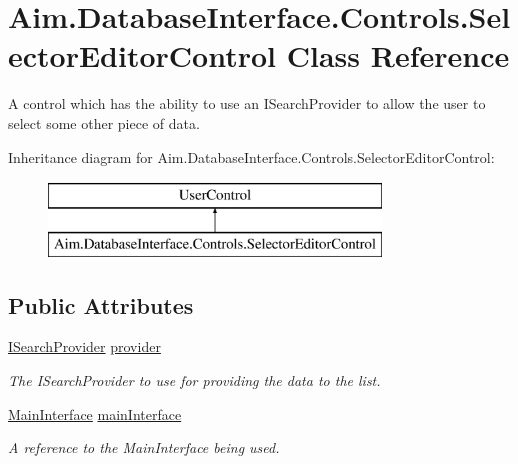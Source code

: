 \hypertarget{class_aim_1_1_database_interface_1_1_controls_1_1_selector_editor_control}{}\section{Aim.\+Database\+Interface.\+Controls.\+Selector\+Editor\+Control Class Reference}
\label{class_aim_1_1_database_interface_1_1_controls_1_1_selector_editor_control}


A control which has the ability to use an I\+Search\+Provider to allow the user to select some other piece of data.  


Inheritance diagram for Aim.\+Database\+Interface.\+Controls.\+Selector\+Editor\+Control\+:\begin{figure}[H]
\begin{center}
\leavevmode
\includegraphics[height=2.000000cm]{class_aim_1_1_database_interface_1_1_controls_1_1_selector_editor_control}
\end{center}
\end{figure}
\subsection*{Public Attributes}
\begin{DoxyCompactItemize}
\item 
\mbox{\hyperlink{interface_aim_1_1_database_interface_1_1_interfaces_1_1_i_search_provider}{I\+Search\+Provider}} \mbox{\hyperlink{class_aim_1_1_database_interface_1_1_controls_1_1_selector_editor_control_aa6b5588445b46d26f12ae503bd694bd4}{provider}}
\begin{DoxyCompactList}\small\item\em The I\+Search\+Provider to use for providing the data to the list. \end{DoxyCompactList}\item 
\mbox{\hyperlink{class_aim_1_1_database_interface_1_1_windows_1_1_main_interface}{Main\+Interface}} \mbox{\hyperlink{class_aim_1_1_database_interface_1_1_controls_1_1_selector_editor_control_a9a3a630a14c28582df8e0fb52f5b824b}{main\+Interface}}
\begin{DoxyCompactList}\small\item\em A reference to the Main\+Interface being used. \end{DoxyCompactList}\end{DoxyCompactItemize}
